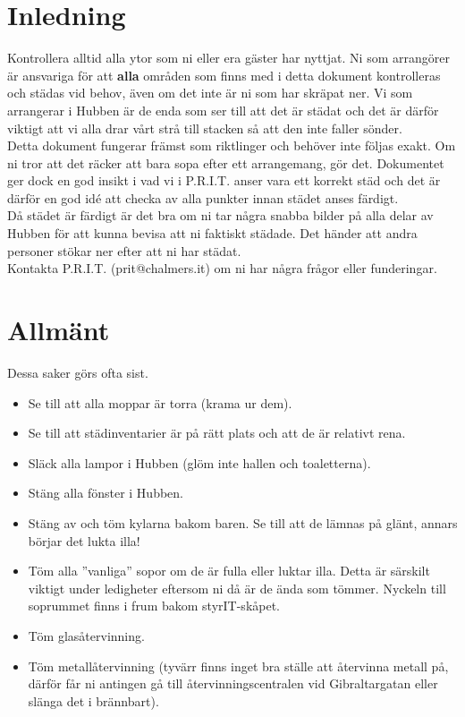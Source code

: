 
\section{Inledning}
Kontrollera alltid alla ytor som ni eller era gäster har nyttjat. Ni som arrangörer är ansvariga för att \textbf{alla} områden som finns med i detta dokument kontrolleras och städas vid behov, även om det inte är ni som har skräpat ner. Vi som arrangerar i Hubben är de enda som ser till att det är städat och det är därför viktigt att vi alla drar vårt strå till stacken så att den inte faller sönder.\\

Detta dokument fungerar främst som riktlinger och behöver inte följas exakt. Om ni tror att det räcker att bara sopa efter ett arrangemang, gör det. Dokumentet ger dock en god insikt i vad vi i P.R.I.T. anser vara ett korrekt städ och det är därför en god idé att checka av alla punkter innan städet anses färdigt.\\

Då städet är färdigt är det bra om ni tar några snabba bilder på alla delar av Hubben för att kunna bevisa att ni faktiskt städade. Det händer att andra personer stökar ner efter att ni har städat.\\

Kontakta P.R.I.T. (prit@chalmers.it) om ni har några frågor eller funderingar.

\section{Allmänt}
Dessa saker görs ofta sist.
\begin{itemize}
    \item Se till att alla moppar är torra (krama ur dem).
    \item Se till att städinventarier är på rätt plats och att de är relativt rena.
    \item Släck alla lampor i Hubben (glöm inte hallen och toaletterna).
    \item Stäng alla fönster i Hubben.
    \item Stäng av och töm kylarna bakom baren. Se till att de lämnas på glänt, annars börjar det lukta illa!
    \item Töm alla ''vanliga'' sopor om de är fulla eller luktar illa. Detta är särskilt viktigt under ledigheter eftersom ni då är de ända som tömmer. Nyckeln till soprummet finns i frum bakom styrIT-skåpet.
    \item Töm glasåtervinning.
    \item Töm metallåtervinning (tyvärr finns inget bra ställe att återvinna metall på, därför får ni antingen gå till återvinningscentralen vid Gibraltargatan eller slänga det i brännbart).
\end{itemize}


